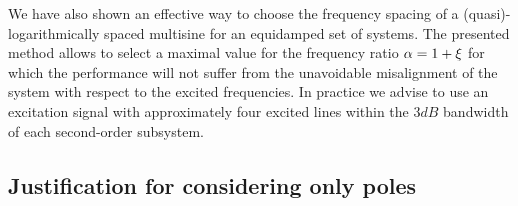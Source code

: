 We have also shown an effective way to choose the frequency spacing of a (quasi)-logarithmically spaced multisine for an equidamped set of systems.
The presented method allows to select a maximal value for the frequency ratio $\alpha = 1 + \xi$ for which the performance will not suffer from the unavoidable misalignment of the system with respect to the excited frequencies.
In practice we advise to use an excitation signal with approximately four excited lines within the $3\unit{dB}$ bandwidth of each second-order subsystem.



\begin{subappendices}
  \section{Justification for considering only poles}

\end{subappendices}


